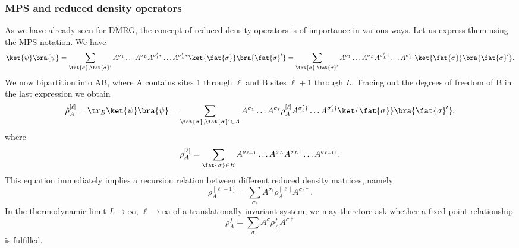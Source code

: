 \subsubsection{MPS and reduced density operators}
As we have already seen for DMRG, the concept of reduced density operators is of importance in various ways. Let us express them using the MPS notation. We have
\begin{equation}
\ket{\psi}\bra{\psi} = \sum_{\fat{\sigma},\fat{\sigma}'} A^{\sigma_1} \ldots A^{\sigma_L} A^{\sigma'_1*} \ldots A^{\sigma'_L*} \ket{\fat{\sigma}} \bra{\fat{\sigma}'} = 
\sum_{\fat{\sigma},\fat{\sigma}'} A^{\sigma_1} \ldots A^{\sigma_L} A^{\sigma'_L\dagger} \ldots A^{\sigma'_1\dagger} \ket{\fat{\sigma}} \bra{\fat{\sigma}'} .
\label{eq:fullstateprojector}
\end{equation}
We now bipartition into AB, where A contains sites 1 through $\ell$ and B sites $\ell+1$ through $L$. Tracing out the degrees of freedom of B in the last expression we obtain
\begin{equation}
\hat{\rho}_A^{[\ell]} = \tr_B \ket{\psi}\bra{\psi} = \sum_{\fat{\sigma},\fat{\sigma}'\in A} 
A^{\sigma_1} \ldots A^{\sigma_\ell} \rho_A^{[\ell]} A^{\sigma'_\ell\dagger} \ldots A^{\sigma'_1\dagger} \ket{\fat{\sigma}} \bra{\fat{\sigma}'} ,
\end{equation}
where
\begin{equation}
\rho_A^{[\ell]} =  \sum_{\fat{\sigma}\in B} A^{\sigma_{\ell+1}} \ldots A^{\sigma_L} A^{\sigma_L\dagger} \ldots A^{\sigma_{\ell+1}\dagger} .
\end{equation}
This equation immediately implies a recursion relation between different reduced density matrices, namely
\begin{equation}
\rho_A^{[\ell-1]} = \sum_{\sigma_\ell} A^{\sigma_\ell} \rho_A^{[\ell]} A^{\sigma_\ell\dagger} .
\label{eq:rhoarecursion}
\end{equation}
In the thermodynamic limit $L\rightarrow\infty$, $\ell\rightarrow\infty$ of a translationally invariant system, we may therefore ask whether a fixed point relationship
\begin{equation}
\rho_A^f = \sum_{\sigma} A^{\sigma} \rho_A^{f} A^{\sigma\dagger} 
\end{equation}
is fulfilled.


